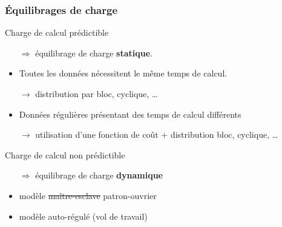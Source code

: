 \documentclass[xcolor={x11names,svgnames}]{beamer}
\begin{document}
\begin{frame}
\frametitle{\'Equilibrages de charge}


\begin{exampleblock}{Charge de calcul prédictible}

  \begin{itemize}
  \item[$\Rightarrow$] équilibrage de charge \textbf{statique}.
    
  \item Toutes les données nécessitent le même temps de calcul.

    $\rightarrow$ distribution par bloc, cyclique, \dots 
    
  \item Données régulières présentant des temps de calcul différents 

    $\rightarrow$ utilisation d'une fonction de coût $+$ distribution
    bloc, cyclique, \dots 

\end{itemize}
\end{exampleblock}

\medskip

\begin{alertblock}{Charge de calcul non prédictible}
  \begin{itemize}
   \item[$\Rightarrow$] équilibrage de charge \textbf{dynamique}
   \item modèle \sout{maître-esclave} patron-ouvrier
   \item modèle auto-régulé (\og vol de travail\fg)
   \end{itemize}
 \end{alertblock}


\end{frame}
\end{document}

